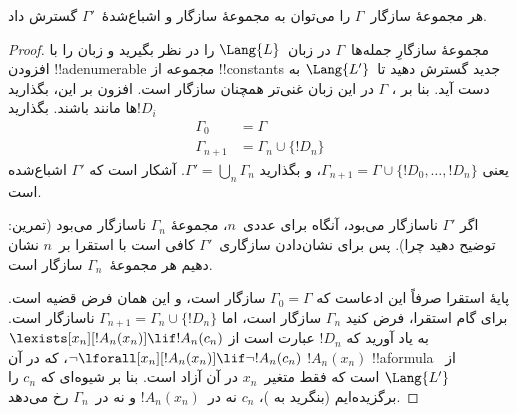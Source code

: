 \documentclass[../../../include/open-logic-section]{subfiles}
\begin{document}
\begin{lem}
هر مجموعهٔ سازگار~$\Gamma$ را می‌توان به مجموعهٔ سازگار و
اشباع‌شدهٔ~$\Gamma'$ گسترش داد.
\end{lem}

\begin{proof}
مجموعهٔ سازگارِ جمله‌ها~$\Gamma$ در زبان~$\Lang{L}$ را در نظر بگیرید و
زبان را با افزودن !!a{denumerable} مجموعه از !!{constant}s جدید گسترش
دهید تا~$\Lang{L'}$ به دست آید. بنا بر ،
$\Gamma$ در این زبان غنی‌تر همچنان سازگار است. افزون بر این، بگذارید
$!D_i$ها مانند  باشند. بگذارید
\begin{align*}
\Gamma_0 & = \Gamma \\
\Gamma_{n+1} & = \Gamma_n \cup \{!D_n \}
\end{align*}
یعنی $\Gamma_{n+1} = \Gamma \cup \{ !D_0, \dots, !D_n \}$، و بگذارید
$\Gamma' = \bigcup_{n} \Gamma_n$. آشکار است که $\Gamma'$ اشباع‌شده
است.

اگر $\Gamma'$ ناسازگار می‌بود، آنگاه برای عددی~$n$، مجموعهٔ
$\Gamma_n$ ناسازگار می‌بود (تمرین: توضیح دهید چرا). پس برای نشان‌دادن
سازگاری~$\Gamma'$ کافی است با استقرا بر~$n$ نشان دهیم هر
مجموعهٔ~$\Gamma_n$ سازگار است.

پایهٔ استقرا صرفاً این ادعاست که $\Gamma_0 = \Gamma$ سازگار است، و این
همان فرض قضیه است. برای گام استقرا، فرض کنید $\Gamma_{n}$ سازگار است،
اما $\Gamma_{n+1} = \Gamma_n \cup \{!D_n\}$ ناسازگار است. به یاد آورید
که $!D_n$ عبارت است از
{$\lexists[x_{n}][!A_{n}(x_n)] \lif !A_{n}(c_{n})$}
{$\lnot\lforall[x_{n}][!A_{n}(x_n)] \lif \lnot !A_{n}(c_{n})$}،
که در آن $!A_n(x_n)$ !!a{formula} از~$\Lang{L'}$ است که فقط
متغیر~$x_n$ در آن آزاد است. بنا بر شیوه‌ای که $c_n$ را برگزیده‌ایم
(بنگرید به )، $c_n$ نه در~$!A_n(x_n)$ و نه
در~$\Gamma_n$ رخ می‌دهد.


\end{proof}
\end{document}
